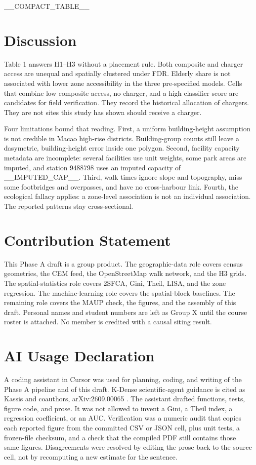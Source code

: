 \documentclass[11pt,a4paper]{article}
\newcommand{\mfourpad}{__PAD_PT__pt}
\begin{document}
__COMPACT_TABLE__

\section{Discussion}
Table 1 answers H1--H3 without a placement rule. Both composite and charger access are unequal and spatially clustered under FDR. Elderly share is not associated with lower zone accessibility in the three pre-specified models. Cells that combine low composite access, no charger, and a high classifier score are candidates for field verification. They record the historical allocation of chargers. They are not sites this study has shown should receive a charger.

Four limitations bound that reading. First, a uniform building-height assumption is not credible in Macao high-rise districts. Building-group counts still leave a dasymetric, building-height error inside one polygon. Second, facility capacity metadata are incomplete: several facilities use unit weights, some park areas are imputed, and station 9488798 uses an imputed capacity of __IMPUTED_CAP__. Third, walk times ignore slope and topography, miss some footbridges and overpasses, and have no cross-harbour link. Fourth, the ecological fallacy applies: a zone-level association is not an individual association. The reported patterns stay cross-sectional.

\vspace*{\mfourpad}




\section*{Contribution Statement}
This Phase A draft is a group product. The geographic-data role covers census geometries, the CEM feed, the OpenStreetMap walk network, and the H3 grids. The spatial-statistics role covers 2SFCA, Gini, Theil, LISA, and the zone regression. The machine-learning role covers the spatial-block baselines. The remaining role covers the MAUP check, the figures, and the assembly of this draft. Personal names and student numbers are left as Group X until the course roster is attached. No member is credited with a causal siting result.

\section*{AI Usage Declaration}
A coding assistant in Cursor was used for planning, coding, and writing of the Phase A pipeline and of this draft. K-Dense scientific-agent guidance is cited as Kassis and coauthors, arXiv:2609.00065 \citep{kassis2026}. The assistant drafted functions, tests, figure code, and prose. It was not allowed to invent a Gini, a Theil index, a regression coefficient, or an AUC. Verification was a numeric audit that copies each reported figure from the committed CSV or JSON cell, plus unit tests, a frozen-file checksum, and a check that the compiled PDF still contains those same figures. Disagreements were resolved by editing the prose back to the source cell, not by recomputing a new estimate for the sentence.
\end{document}

